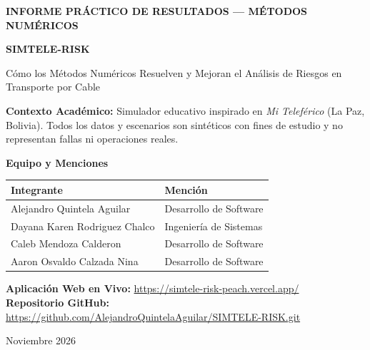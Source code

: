 \documentclass[11pt,a4paper]{article}
\begin{document}
\begin{titlepage}
    \centering
    \vspace*{1.5cm}
    {\Large \textbf{INFORME PRÁCTICO DE RESULTADOS — MÉTODOS NUMÉRICOS}\par}
    \vspace{0.8cm}
    {\Huge \textbf{\textcolor{primary}{SIMTELE-RISK}}\par}
    \vspace{0.4cm}
    {\Large Cómo los Métodos Numéricos Resuelven y Mejoran el Análisis de Riesgos en Transporte por Cable\par}
    \vspace{1.2cm}
    \begin{tcolorbox}[colback=softbg,colframe=primary,width=0.9\textwidth]
        \centering
        \textbf{Contexto Académico:} Simulador educativo inspirado en \textit{Mi Teleférico} (La Paz, Bolivia). Todos los datos y escenarios son sintéticos con fines de estudio y no representan fallas ni operaciones reales.
    \end{tcolorbox}
    \vspace{1.4cm}

    \textbf{\large Equipo y Menciones}\\[0.4cm]
    \begin{tabular}{ll}
        \toprule
        \textbf{Integrante} & \textbf{Mención} \\
        \midrule
        Alejandro Quintela Aguilar & Desarrollo de Software \\
        Dayana Karen Rodriguez Chalco & Ingeniería de Sistemas \\
        Caleb Mendoza Calderon & Desarrollo de Software \\
        Aaron Osvaldo Calzada Nina & Desarrollo de Software \\
        \bottomrule
    \end{tabular}

    \vfill
    \textbf{Aplicación Web en Vivo:} \url{https://simtele-risk-peach.vercel.app/}\\
    \textbf{Repositorio GitHub:} \url{https://github.com/AlejandroQuintelaAguilar/SIMTELE-RISK.git}\\[0.5cm]
    {\large Noviembre 2026\par}
\end{titlepage}

\tableofcontents
\newpage

\end{document}

